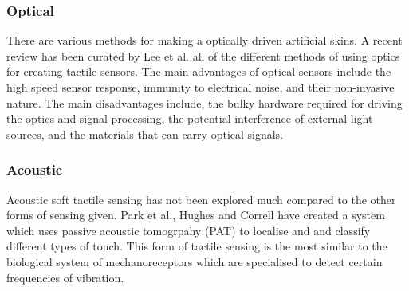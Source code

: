 \subsubsection{Optical}
There are various methods for making a optically driven artificial skins. A recent review has been curated by Lee et al. \cite{Lee2023} all of the different methods of using optics for creating tactile sensors. The main advantages of optical sensors include the high speed sensor response, immunity to electrical noise, and their non-invasive nature. The main disadvantages include, the bulky hardware required for driving the optics and signal processing, the potential interference of external light sources, and the materials that can carry optical signals. 

\subsubsection{Acoustic}
Acoustic soft tactile sensing has not been explored much compared to the other forms of sensing given. Park et al., Hughes and Correll \cite{Park2022,Hughes2015} have created a system which uses passive acoustic tomogrpahy (PAT) to localise and and classify different types of touch. This form of tactile sensing is the most similar to the biological system of mechanoreceptors which are specialised to detect certain frequencies of vibration.


